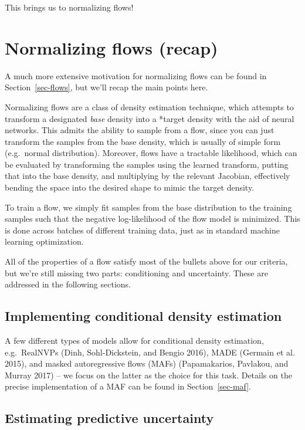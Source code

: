 \documentclass[
  11pt,
  numbers=noendperiod]{book}
\begin{document}
This brings us to normalizing flows!

\hypertarget{normalizing-flows-recap}{%
\section{Normalizing flows (recap)}\label{normalizing-flows-recap}}

A much more extensive motivation for normalizing flows can be found in
Section~\ref{sec-flows}, but we'll recap the main points here.

Normalizing flows are a class of density estimation technique, which
attempts to transform a designated \emph{base} density into a *target
density with the aid of neural networks. This admits the ability to
sample from a flow, since you can just transform the samples from the
base density, which is usually of simple form (e.g.~normal
distribution). Moreover, flows have a tractable likelihood, which can be
evaluated by transforming the samples using the learned transform,
putting that into the base density, and multiplying by the relevant
Jacobian, effectively bending the space into the desired shape to mimic
the target density.

To train a flow, we simply fit samples from the base distribution to the
training samples such that the negative log-likelihood of the flow model
is minimized. This is done across batches of different training data,
just as in standard machine learning optimization.

All of the properties of a flow satisfy most of the bullets above for
our criteria, but we're still missing two parts: conditioning and
uncertainty. These are addressed in the following sections.

\hypertarget{implementing-conditional-density-estimation}{%
\subsection{Implementing conditional density
estimation}\label{implementing-conditional-density-estimation}}

A few different types of models allow for conditional density
estimation, e.g.~RealNVPs (Dinh, Sohl-Dickstein, and Bengio 2016), MADE
(Germain et al. 2015), and masked autoregressive flows (MAFs)
(Papamakarios, Pavlakou, and Murray 2017) -- we focus on the latter as
the choice for this task. Details on the precise implementation of a MAF
can be found in Section~\ref{sec-maf}.

\hypertarget{estimating-predictive-uncertainty}{%
\subsection{Estimating predictive
uncertainty}\label{estimating-predictive-uncertainty}}
\end{document}
